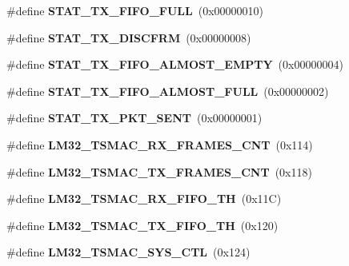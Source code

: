 \begin{DoxyCompactItemize}
\#define {\bfseries S\+T\+A\+T\+\_\+\+T\+X\+\_\+\+F\+I\+F\+O\+\_\+\+F\+U\+LL}~(0x00000010)
\item 
\mbox{\label{group__lm32__tsmac_gafa1bd028cab23d6567026fe4216d3576}} 
\#define {\bfseries S\+T\+A\+T\+\_\+\+T\+X\+\_\+\+D\+I\+S\+C\+F\+RM}~(0x00000008)
\item 
\mbox{\label{group__lm32__tsmac_gae8b6eaedb67d77f24ba5b46a030f5ae1}} 
\#define {\bfseries S\+T\+A\+T\+\_\+\+T\+X\+\_\+\+F\+I\+F\+O\+\_\+\+A\+L\+M\+O\+S\+T\+\_\+\+E\+M\+P\+TY}~(0x00000004)
\item 
\mbox{\label{group__lm32__tsmac_gaffcdbe58563efa2af570d65e13553287}} 
\#define {\bfseries S\+T\+A\+T\+\_\+\+T\+X\+\_\+\+F\+I\+F\+O\+\_\+\+A\+L\+M\+O\+S\+T\+\_\+\+F\+U\+LL}~(0x00000002)
\item 
\mbox{\label{group__lm32__tsmac_ga0459f30d4eb8cb8adae332f285d8a71a}} 
\#define {\bfseries S\+T\+A\+T\+\_\+\+T\+X\+\_\+\+P\+K\+T\+\_\+\+S\+E\+NT}~(0x00000001)
\item 
\mbox{\label{group__lm32__tsmac_ga1c1c5214fbb717df086c0b28f497154a}} 
\#define {\bfseries L\+M32\+\_\+\+T\+S\+M\+A\+C\+\_\+\+R\+X\+\_\+\+F\+R\+A\+M\+E\+S\+\_\+\+C\+NT}~(0x114)
\item 
\mbox{\label{group__lm32__tsmac_ga0fd3b9332f6891f460cb0beb1c61096a}} 
\#define {\bfseries L\+M32\+\_\+\+T\+S\+M\+A\+C\+\_\+\+T\+X\+\_\+\+F\+R\+A\+M\+E\+S\+\_\+\+C\+NT}~(0x118)
\item 
\mbox{\label{group__lm32__tsmac_gaf796dc8d60a42eea28e0340e2c0a85d1}} 
\#define {\bfseries L\+M32\+\_\+\+T\+S\+M\+A\+C\+\_\+\+R\+X\+\_\+\+F\+I\+F\+O\+\_\+\+TH}~(0x11\+C)
\item 
\mbox{\label{group__lm32__tsmac_ga64346596504ea5a68d047d6221074011}} 
\#define {\bfseries L\+M32\+\_\+\+T\+S\+M\+A\+C\+\_\+\+T\+X\+\_\+\+F\+I\+F\+O\+\_\+\+TH}~(0x120)
\item 
\mbox{\label{group__lm32__tsmac_gaf53d410447813ef5d5cdd1e227762c35}} 
\#define {\bfseries L\+M32\+\_\+\+T\+S\+M\+A\+C\+\_\+\+S\+Y\+S\+\_\+\+C\+TL}~(0x124)

\end{DoxyCompactItemize}
